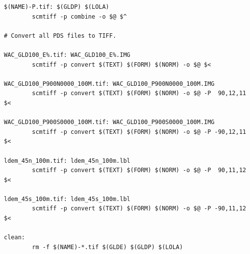 \documentclass[oneside,10pt]{memoir}
\begin{document}
\begin{Spacing}{1.1}
\begin{Verbatim}
$(NAME)-P.tif: $(GLDP) $(LOLA)
        scmtiff -p combine -o $@ $^

# Convert all PDS files to TIFF.

WAC_GLD100_E%.tif: WAC_GLD100_E%.IMG
        scmtiff -p convert $(TEXT) $(FORM) $(NORM) -o $@ $<

WAC_GLD100_P900N0000_100M.tif: WAC_GLD100_P900N0000_100M.IMG
        scmtiff -p convert $(TEXT) $(FORM) $(NORM) -o $@ -P  90,12,11 $<

WAC_GLD100_P900S0000_100M.tif: WAC_GLD100_P900S0000_100M.IMG
        scmtiff -p convert $(TEXT) $(FORM) $(NORM) -o $@ -P -90,12,11 $<

ldem_45n_100m.tif: ldem_45n_100m.lbl
        scmtiff -p convert $(TEXT) $(FORM) $(NORM) -o $@ -P  90,11,12 $<

ldem_45s_100m.tif: ldem_45s_100m.lbl
        scmtiff -p convert $(TEXT) $(FORM) $(NORM) -o $@ -P -90,11,12 $<

clean:
        rm -f $(NAME)-*.tif $(GLDE) $(GLDP) $(LOLA)
\end{Verbatim}

\printpagenotes
\end{Spacing}
\end{document}
